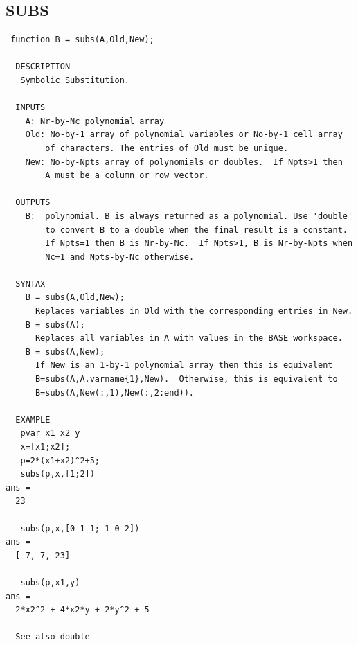 \documentclass{article}
\begin{document}
\newpage
\subsection{SUBS}
\begin{verbatim}
 function B = subs(A,Old,New);

  DESCRIPTION
   Symbolic Substitution.

  INPUTS
    A: Nr-by-Nc polynomial array
    Old: No-by-1 array of polynomial variables or No-by-1 cell array
        of characters. The entries of Old must be unique.
    New: No-by-Npts array of polynomials or doubles.  If Npts>1 then
        A must be a column or row vector.

  OUTPUTS
    B:  polynomial. B is always returned as a polynomial. Use 'double'
        to convert B to a double when the final result is a constant.
        If Npts=1 then B is Nr-by-Nc.  If Npts>1, B is Nr-by-Npts when
        Nc=1 and Npts-by-Nc otherwise.

  SYNTAX
    B = subs(A,Old,New);
      Replaces variables in Old with the corresponding entries in New.
    B = subs(A);
      Replaces all variables in A with values in the BASE workspace.
    B = subs(A,New);
      If New is an 1-by-1 polynomial array then this is equivalent
      B=subs(A,A.varname{1},New).  Otherwise, this is equivalent to
      B=subs(A,New(:,1),New(:,2:end)).

  EXAMPLE
   pvar x1 x2 y
   x=[x1;x2];
   p=2*(x1+x2)^2+5;
   subs(p,x,[1;2])
ans =
  23

   subs(p,x,[0 1 1; 1 0 2])
ans =
  [ 7, 7, 23]

   subs(p,x1,y)
ans =
  2*x2^2 + 4*x2*y + 2*y^2 + 5

  See also double

\end{verbatim}

\newpage
\end{document}
